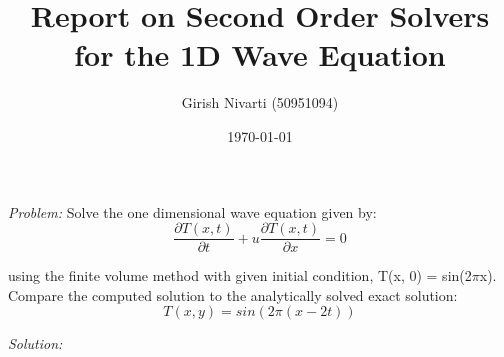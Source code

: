 \documentclass[a4paper,10pt]{article}
\title{Report on Second Order Solvers for the 1D Wave Equation}
\author{Girish Nivarti (50951094)}
\date{\today}
\begin{document}
\maketitle

\emph{Problem:} Solve the one dimensional wave equation given by:
\begin{equation}
  \frac{\partial T(x,t)}{\partial t} +   u\frac{\partial T(x,t)}{\partial x} = 0 
\end{equation}

using the finite volume method with given initial condition, T(x, 0) = sin(2$\pi$x). Compare the computed solution to the analytically solved exact solution:
\begin{equation}
  T(x,y) = sin(2\pi(x - 2t))
\end{equation}


\emph{Solution:} 
\end{document}
